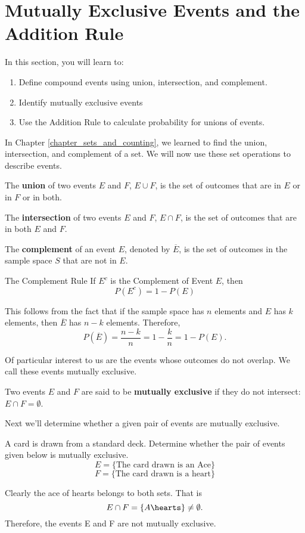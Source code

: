 \section{Mutually Exclusive Events and the Addition Rule}

In this section, you will learn to:
\begin{enumerate}
    \item Define compound events using union, intersection, and complement.
    \item Identify mutually exclusive events
    \item Use the Addition Rule to calculate probability for unions of events.
\end{enumerate}

In Chapter \ref{chapter_sets_and_counting}, we learned to find the union, intersection, and complement of a set. We will now use these set operations to describe events.

The \textbf{union} of two events \(E\) and \(F\), \(E \cup F\), is the set of outcomes that are in \(E\) or in \(F\) or in both.

The \textbf{intersection} of two events \(E\) and \(F\), \(E \cap F\), is the set of outcomes that are in both \(E\) and \(F\).

The \textbf{complement} of an event \(E\), denoted by \(\overline{E}\), is the set of outcomes in the sample space \(S\) that are not in \(E\).

\begin{summarybox}{The Complement Rule}
    If \(E^c\) is the Complement of Event \(E\), then
    \[ P(E^c) = 1 - P(E) \]
\end{summarybox}


This follows from the fact that if the sample space has \(n\) elements and \(E\) has \(k\) elements, then \(\overline{E}\) has \(n - k\) elements. Therefore,
\[
    P\left(\overline{E}\right) = \frac{n - k}{n} = 1 - \frac{k}{n} = 1 - P(E).
\]

Of particular interest to us are the events whose outcomes do not overlap. We call these events mutually exclusive.

Two events \(E\) and \(F\) are said to be \textbf{mutually exclusive} if they do not intersect: \(E \cap F = \emptyset\).

Next we'll determine whether a given pair of events are mutually exclusive.

\begin{example}
    A card is drawn from a standard deck. Determine whether the pair of events given below is mutually exclusive.
    \[ E = \{\text{The card drawn is an Ace}\} \]
    \[ F = \{\text{The card drawn is a heart}\} \]
\end{example}
\begin{solution}
    Clearly the ace of hearts belongs to both sets. That is
    \[ E \cap F = \{A\hearts\} \neq \emptyset. \]
    Therefore, the events E and F are not mutually exclusive.
\end{solution}

